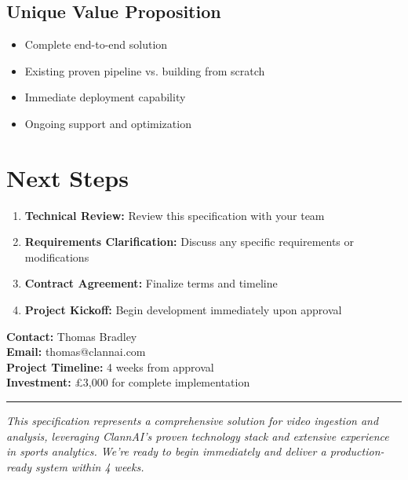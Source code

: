 \documentclass[11pt,a4paper]{article}
\begin{document}
\subsection{Unique Value Proposition}
\begin{itemize}[leftmargin=1.5cm]
    \item Complete end-to-end solution
    \item Existing proven pipeline vs. building from scratch
    \item Immediate deployment capability
    \item Ongoing support and optimization
\end{itemize}

\section{Next Steps}

\begin{enumerate}[leftmargin=1.5cm]
    \item \textbf{Technical Review:} Review this specification with your team
    \item \textbf{Requirements Clarification:} Discuss any specific requirements or modifications
    \item \textbf{Contract Agreement:} Finalize terms and timeline
    \item \textbf{Project Kickoff:} Begin development immediately upon approval
\end{enumerate}

\vspace{1cm}

\begin{center}
\textbf{Contact:} Thomas Bradley\\
\textbf{Email:} thomas@clannai.com\\
\textbf{Project Timeline:} 4 weeks from approval\\
\textbf{Investment:} £3,000 for complete implementation
\end{center}

\vspace{1cm}

\hrule

\vspace{0.5cm}

\small\textit{This specification represents a comprehensive solution for video ingestion and analysis, leveraging ClannAI's proven technology stack and extensive experience in sports analytics. We're ready to begin immediately and deliver a production-ready system within 4 weeks.}
\end{document}
